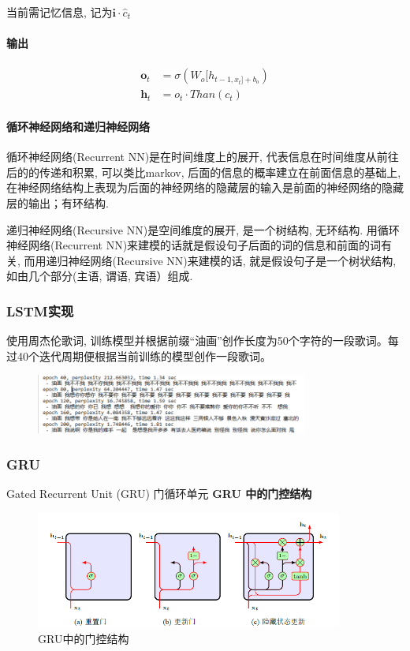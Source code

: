 \documentclass[a4paper]{article}
\begin{document}
当前需记忆信息, 记为$\mathbf{i} \cdot \hat{c}_t$

\paragraph{输出}
\begin{align*}
\mathbf{o}_t  & =\sigma(W_o[h_{t-1, x_t]+b_o}) \\
\mathbf{h}_t & ={o}_t \cdot Than(c_t)
\end{align*}
 

\paragraph{循环神经网络和递归神经网络}

循环神经网络(Recurrent NN)是在时间维度上的展开, 代表信息在时间维度从前往后的的传递和积累, 可以类比markov, 后面的信息的概率建立在前面信息的基础上, 在神经网络结构上表现为后面的神经网络的隐藏层的输入是前面的神经网络的隐藏层的输出；有环结构.

递归神经网络(Recursive NN)是空间维度的展开, 是一个树结构, 无环结构.
用循环神经网络(Recurrent NN)来建模的话就是假设句子后面的词的信息和前面的词有关, 而用递归神经网络(Recursive NN)来建模的话, 就是假设句子是一个树状结构, 如由几个部分(主语, 谓语, 宾语）组成.

\subsubsection{LSTM实现}
使用周杰伦歌词, 训练模型并根据前缀“油画”创作⻓度为50个字符的⼀段歌词。每过40个迭代周期便根据当前训练的模型创作⼀段歌词。
\begin{figure}[!ht]
    \center
    \includegraphics[width=0.8\textwidth]{lyrics.png}
    \end{figure} 
\subsubsection{GRU}
Gated Recurrent Unit (GRU) 门循环单元
\textbf{GRU 中的门控结构}

\begin{figure}[!htb]
\centering
\includegraphics[width=0.9\textwidth]{GRU.png}
\caption{GRU中的门控结构}
\end{figure}
\end{document}
